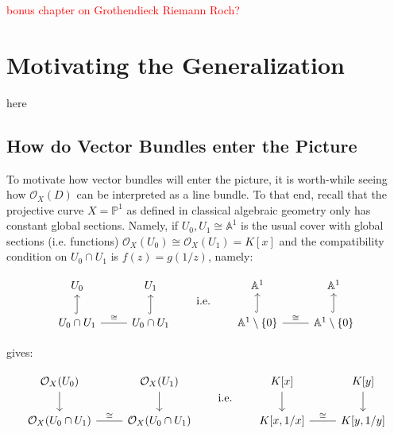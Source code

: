 \documentclass{book}
\newcommand{\A}{{\mathbb{A}}}
\renewcommand{\P}{{\mathbb{P}}}
\newcommand{\CO}{{\mathcal{O}}}
\begin{document}
\textcolor{red}{bonus chapter on Grothendieck Riemann Roch?}

\section{Motivating the Generalization}

here
\subsection{How do Vector Bundles enter the Picture}\label{sec:whyVecBundles}

To motivate how vector bundles will enter the picture, it is worth-while seeing how $\CO_X(D)$ can be
interpreted as a line bundle. To that end, recall that the projective curve $X = \P^1$ as defined in classical
algebraic geometry only has constant global sections. Namely, if $U_0, U_1\cong \A^1$ is the usual cover with
global sections (i.e. functions) $\CO_X(U_0) \cong \CO_X(U_1) = K[x]$ and the compatibility condition on
$U_0\cap U_1$ is $f(z) = g(1/z)$, namely:
\begin{center}
  \[
\begin{tikzcd}
U_0                                               &               U_1 \\
     U_0\cap U_1 \arrow[r, "\cong", no head] \arrow[u, hook] & U_0\cap U_1 \arrow[u, hook]
\end{tikzcd}
\qquad \text{i.e.} \qquad
\begin{tikzcd}
\A^1                                       &              \A^1 \\
     \A^1\setminus\{0\} \arrow[u, hook] \arrow[r, "\cong", no head] & \A^1\setminus\{0\} \arrow[u, hook]
\end{tikzcd}
\]
\end{center}
gives:
\begin{center}
  \[
\begin{tikzcd}
\CO_X(U_0) \arrow[d]                                &              \CO_X(U_1) \arrow[d] \\
                    \CO_X(U_0\cap U_1) \arrow[r, "\cong", no head] & \CO_X(U_0\cap U_1)
\end{tikzcd}
\qquad \text{i.e.} \qquad
\begin{tikzcd}
{K[x]} \arrow[d]                        & {K[y]} \arrow[d] \\
{K[x, 1/x]} \arrow[r, "\cong", no head] & {K[y, 1/y]}
\end{tikzcd}
\]
\end{center}
\end{document}
